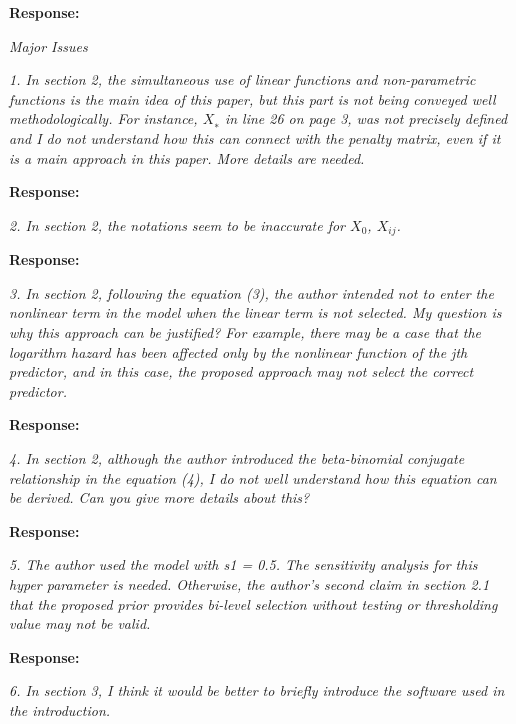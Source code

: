 \documentclass[11pt]{article}
\begin{document}
\medskip

\textbf{Response:}

\bigskip

{\em Major Issues}


\medskip

{\em 1. In section 2, the simultaneous use of linear functions and non-parametric functions is the main idea of this paper, but this part is not being conveyed well methodologically. For instance, $X_∗$ in line 26 on page 3, was not precisely defined and I do not understand how this can connect with the penalty matrix, even if it is a main approach in this paper. More details are needed.}

\medskip

\textbf{Response:} 

\bigskip

{\em 2. In section 2, the notations seem to be inaccurate for $X_0$, $X_{ij}$.}

\medskip

\textbf{Response:} 

\bigskip

{\em 3. In section 2, following the equation (3), the author intended not to enter the nonlinear term in the model when the linear term is not selected. My question is why this approach can be justified? For example, there may be a case that the logarithm hazard has been affected only by the nonlinear function of the jth predictor, and in this case, the proposed approach may not select the correct predictor.}

\medskip

\textbf{Response:} 

\bigskip

{\em 4. In section 2, although the author introduced the beta-binomial conjugate relationship in the equation (4), I do not well understand how this equation can be derived. Can you give more details about this?}

\medskip

\textbf{Response:} 

{\em 5. The author used the model with s1 = 0.5. The sensitivity analysis for this hyper parameter is needed. Otherwise, the author’s second claim in section 2.1 that the proposed prior provides bi-level selection without testing or thresholding value may not be valid.}
\medskip

\textbf{Response:} 

\bigskip

{\em 6. In section 3, I think it would be better to briefly introduce the software used in the introduction.}
\end{document}
